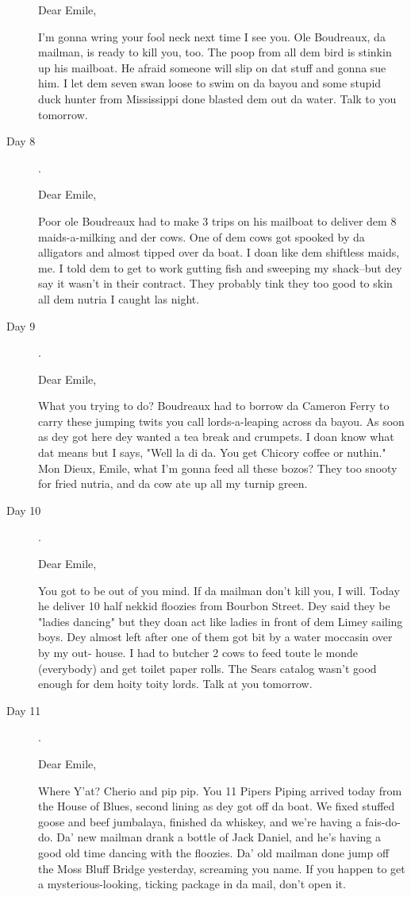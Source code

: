 \documentclass[fleqn,addpoints]{exam}
\begin{document}
\begin{description}
Dear Emile,

I'm gonna wring your fool neck next time I see you. Ole Boudreaux, da mailman, is ready to kill you, too. The poop from
all dem bird is stinkin up his mailboat. He afraid someone will slip on dat stuff and gonna sue him. I let dem seven
swan loose to swim on da bayou and some stupid duck hunter from Mississippi done blasted dem out da water. Talk to you
tomorrow.

\item[Day 8].

Dear Emile,

Poor ole Boudreaux had to make 3 trips on his mailboat to deliver dem 8 maids-a-milking and der cows. One of dem cows
got spooked by da alligators and almost tipped over da boat. I doan like dem shiftless maids, me. I told dem to get to
work gutting fish and sweeping my shack--but dey say it wasn't in their contract. They probably tink they too good to
skin all dem nutria I caught las night.

\item[Day 9].

Dear Emile,

What you trying to do? Boudreaux had to borrow da Cameron Ferry to carry these jumping twits you call lords-a-leaping
across da bayou. As soon as dey got here dey wanted a tea break and crumpets. I doan know what dat means but I says,
"Well la di da. You get Chicory coffee or nuthin." Mon Dieux, Emile, what I'm gonna feed all these bozos? They too
snooty for fried nutria, and da cow ate up all my turnip green.

\item[Day 10].

Dear Emile,

You got to be out of you mind. If da mailman don't kill you, I will. Today he deliver 10 half nekkid floozies from
Bourbon Street. Dey said they be "ladies dancing" but they doan act like ladies in front of dem Limey sailing boys. Dey
almost left after one of them got bit by a water moccasin over by my out- house. I had to butcher 2 cows to feed toute
le monde (everybody) and get toilet paper rolls. The Sears catalog wasn't good enough for dem hoity toity lords. Talk at
you tomorrow.

\item[Day 11].

Dear Emile,

Where Y'at? Cherio and pip pip. You 11 Pipers Piping arrived today from the House of Blues, second lining as dey got off
da boat. We fixed stuffed goose and beef jumbalaya, finished da whiskey, and we're having a fais-do-do. Da' new mailman
drank a bottle of Jack Daniel, and he's having a good old time dancing with the floozies. Da' old mailman done jump off
the Moss Bluff Bridge yesterday, screaming you name. If you happen to get a mysterious-looking, ticking package in da
mail, don't open it.


\end{description}
\end{document}
